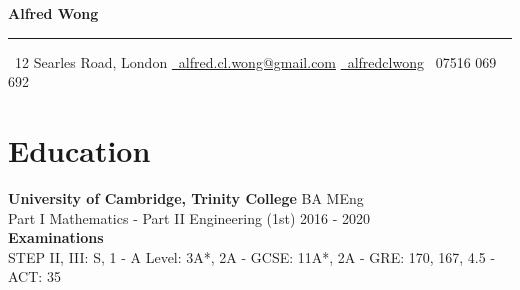 \documentclass[letterpaper, 10pt]{article}
\begin{document}
\begin{center}
	{\bfseries\huge Alfred Wong}\\
	\vspace{-.5\baselineskip}\rule{\textwidth}{0.8pt}
	\faMapMarker\ 12 Searles Road, London
	\quad
	\href{mailto:alfred.cl.wong@gmail.com}{{\small\faEnvelope}\ alfred.cl.wong@gmail.com}
	\quad
	\href{https://github.com/alfredclwong}{\faGithub\ alfredclwong}
	\quad
	\faPhone\ 07516 069 692
\end{center}

\section*{Education}
\textbf{University of Cambridge, Trinity College} \hfill BA MEng\\
Part I Mathematics - Part II Engineering (1st) \hfill 2016 - 2020\vspace{.5\baselineskip}\\
\textbf{Examinations}\\
STEP II, III: S, 1 - A Level: 3A*, 2A - GCSE: 11A*, 2A - GRE: 170, 167, 4.5 - ACT: 35
\end{document}

